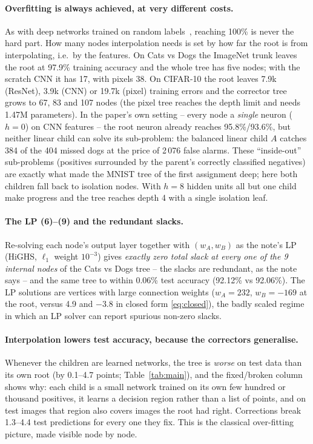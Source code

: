 \paragraph{Overfitting is always achieved, at very different costs.}
As with deep networks trained on random labels~\cite{zhang},
reaching 100\% is never the hard part. How many nodes interpolation needs is set by how far the root is from interpolating, i.e.\ by the
features. On Cats vs Dogs the ImageNet trunk leaves the root at 97.9\% training accuracy and the whole
tree has five nodes; with the scratch CNN it has 17, with pixels 38. On CIFAR-10 the root leaves 7.9k
(ResNet), 3.9k (CNN) or 19.7k (pixel) training errors and the corrector tree grows to
67, 83 and 107 nodes (the pixel tree reaches the depth limit and needs 1.47M parameters). In the paper's own setting -- every node a \emph{single} neuron
($h=0$) on CNN features -- the root neuron already reaches 95.8\%/93.6\%, but neither linear child
can solve its sub-problem: the balanced linear child $A$ catches 384 of the 404 missed dogs at the
price of 2\,076 false alarms. These ``inside-out'' sub-problems (positives surrounded by the
parent's correctly classified negatives) are exactly what made the MNIST tree of the first assignment
deep; here both children fall back to isolation nodes. With $h=8$ hidden units all but one child make
progress and the tree reaches depth 4 with a single isolation leaf.

\paragraph{The LP (6)--(9) and the redundant slacks.} Re-solving each node's output layer
together with $(w_A,w_B)$ as the note's LP (HiGHS, $\ell_1$ weight $10^{-3}$) gives \emph{exactly zero
total slack at every one of the 9 internal nodes} of the Cats vs Dogs tree -- the slacks are redundant,
as the note says -- and the same tree to within 0.06\% test accuracy (92.12\% vs 92.06\%). The LP
solutions are vertices with large connection weights ($w_A=232$, $w_B=-169$ at the root, versus
4.9 and $-3.8$ in closed form \eqref{eq:closed}), the badly scaled regime in which an LP solver can
report spurious non-zero slacks.

\paragraph{Interpolation lowers test accuracy, because the correctors generalise.}
Whenever the children are learned networks, the tree is \emph{worse} on test data than its own
root (by 0.1--4.7 points; Table~\ref{tab:main}), and the fixed/broken column shows why: each child is a small network trained on its
own few hundred or thousand positives, it learns a decision region rather than a list of points, and
on test images that region also covers images the root had right. Corrections break 1.3--4.4 test
predictions for every one they fix. This is the classical over-fitting picture, made visible node
by node.

